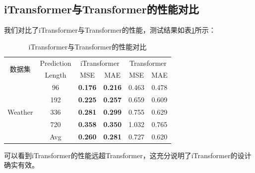 \documentclass[twoside,12pt]{article}
\begin{document}
\subsection{iTransformer与Transformer的性能对比}
我们对比了iTransformer与Transformer的性能，测试结果如表\ref{tab:itransformer_vs_transformer}所示：
\begin{table}[htbp]
  \caption{iTransformer与Transformer的性能对比}
  \label{tab:itransformer_vs_transformer}
  \vspace{5pt}
  \centering
  \begin{tabular}{c|c|cc|cc}
    \toprule
    \multirow{2}{*}{数据集}  & Prediction & \multicolumn{2}{c|}{iTransformer} & \multicolumn{2}{c}{Transformer}                 \\
    \cmidrule(lr){3-4} \cmidrule(lr){5-6}
                             & Length     & MSE                               & MAE                             & MSE   & MAE   \\
    \midrule
    \multirow{5}{*}{Weather} & 96         & \textbf{0.176}                    & \textbf{0.216}                  & 0.463 & 0.478 \\
                             & 192        & \textbf{0.225}                    & \textbf{0.257}                  & 0.659 & 0.609 \\
                             & 336        & \textbf{0.281}                    & \textbf{0.299}                  & 0.755 & 0.629 \\
                             & 720        & \textbf{0.358}                    & \textbf{0.350}                  & 1.032 & 0.765 \\
    \cmidrule(lr){2-6}
                             & Avg        & \textbf{0.260}                    & \textbf{0.281}                  & 0.727 & 0.620 \\
    \bottomrule
    \bottomrule
  \end{tabular}
\end{table}

可以看到iTransformer的性能远超Transformer，这充分说明了iTransformer的设计确实有效。
\end{document}
